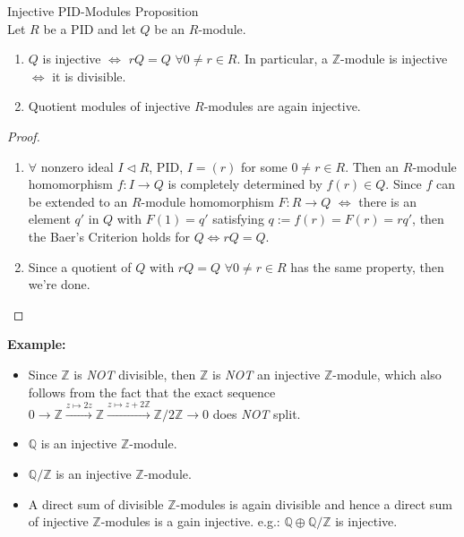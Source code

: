 \begin{proposition}{Injective PID-Modules Proposition}\\
Let $R$ be a PID and let $Q$ be an $R$-module.
\begin{enumerate}
    \item $Q$ is injective $\Leftrightarrow$ $rQ =Q$ $\forall 0\neq r \in R$. In particular, a $\mathbb{Z}$-module is injective $\Leftrightarrow$ it is divisible.

    \item Quotient modules of injective $R$-modules are again injective.
\end{enumerate}
\end{proposition}

\begin{proof}
    \begin{enumerate}
        \item $\forall$ nonzero ideal $I \triangleleft R$, PID, $I= (r)$ for some $0 \neq r \in R$. Then an $R$-module homomorphism $f:I \to Q$ is completely determined by $f(r) \in Q$. Since $f$ can be extended to an $R$-module homomorphism $F: R\to Q$ $\Leftrightarrow$ there is an element $q'$ in $Q$ with $F(1)=q'$ satisfying $q:= f(r) =F(r) =rq'$, then the Baer's Criterion holds for $Q \Leftrightarrow rQ=Q$.
        \item Since a quotient of $Q$ with $rQ=Q$ $\forall 0\neq r\in R$ has the same property, then we're done.
    \end{enumerate}
\end{proof}

\noindent\textbf{Example:} \begin{itemize}
    \item Since $\mathbb{Z}$ is \textit{NOT} divisible, then $\mathbb{Z}$ is \textit{NOT} an injective $\mathbb{Z}$-module, which also follows from the fact that the exact sequence $0 \to \mathbb{Z} \overset{z \mapsto 2z}{\longrightarrow} \mathbb{Z} \overset{z \mapsto z+2\mathbb{Z}}{\longrightarrow} \mathbb{Z}/ 2\mathbb{Z} \to0$ does \textit{NOT} split.

    \item $\mathbb{Q}$ is an injective $\mathbb{Z}$-module.
    \item $\mathbb{Q}/\mathbb{Z}$ is an injective $\mathbb{Z}$-module.
    \item A direct sum of divisible $\mathbb{Z}$-modules is again divisible and hence a direct sum of injective $\mathbb{Z}$-modules is a gain injective. e.g.: $\mathbb{Q} \oplus \mathbb{Q} /\mathbb{Z}$ is injective.
\end{itemize}

